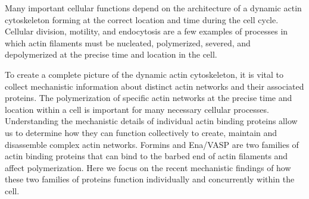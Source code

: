 \abstract
Many important cellular functions depend on the architecture of a dynamic actin cytoskeleton forming at the correct location and time during the cell cycle. Cellular division, motility, and endocytosis are a few examples of processes in which actin filaments must be nucleated, polymerized, severed, and depolymerized at the precise time and location in the cell. 

To create a complete picture of the dynamic actin cytoskeleton, it is vital to collect mechanistic information about distinct actin networks and their associated proteins. The polymerization of specific actin networks at the precise time and location within a cell is important for many necessary cellular processes. Understanding the mechanistic details of individual actin binding proteins allow us to determine how they can function collectively to create, maintain and disassemble complex actin networks. Formins and Ena/VASP are two families of actin binding proteins that can bind to the barbed end of actin filaments and affect polymerization. Here we focus on the recent mechanistic findings of how these two families of proteins function individually and concurrently within the cell.
